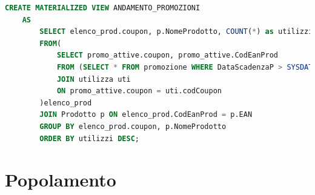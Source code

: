 \documentclass[12pt]{report}
\begin{document}
\begin{lstlisting}[language=SQL,caption={ANDAMENTO\_PROMO}]
    CREATE MATERIALIZED VIEW ANDAMENTO_PROMOZIONI
    AS
        SELECT elenco_prod.coupon, p.NomeProdotto, COUNT(*) as utilizzi
        FROM(
            SELECT promo_attive.coupon, promo_attive.CodEanProd
            FROM (SELECT * FROM promozione WHERE DataScadenzaP > SYSDATE) promo_attive
            JOIN utilizza uti
            ON promo_attive.coupon = uti.codCoupon
        )elenco_prod
        JOIN Prodotto p ON elenco_prod.CodEanProd = p.EAN
        GROUP BY elenco_prod.coupon, p.NomeProdotto
        ORDER BY utilizzi DESC;
\end{lstlisting}

\newpage
\section{Popolamento}
\end{document}
